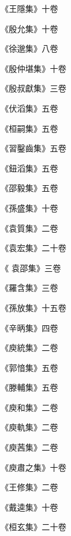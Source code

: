 \begin{pinyinscope}
 《王隱集》十卷



 《殷允集》十卷



 《徐邈集》八卷



 《殷仲堪集》十卷



 《殷叔獻集》三卷



 《伏滔集》五卷



 《桓嗣集》五卷



 《習鑿齒集》五卷



 《鈕滔集》五卷



 《邵毅集》五卷



 《孫盛集》十卷



 《袁質集》二卷



 《袁宏集》二十卷



 《
 袁邵集》三卷



 《羅含集》三卷



 《孫放集》十五卷



 《辛昞集》四卷



 《庾統集》二卷



 《郭愔集》五卷



 《滕輔集》五卷



 《庾和集》二卷



 《庾軌集》二卷



 《庾茜集》二卷



 《庾肅之集》十卷



 《王修集》二卷



 《戴逵集》十卷



 《桓玄集》二十卷




\end{pinyinscope}
